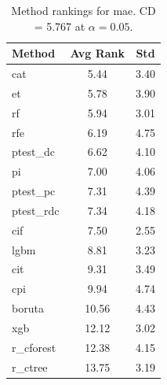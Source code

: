 \begin{table}[h]
\centering
\caption{Method rankings for mae. CD = 5.767 at $\alpha=0.05$.}
\label{tab:ranks_mae}
\begin{tabular}{lcc}
\toprule
Method & Avg Rank & Std \\
\midrule
cat & 5.44 & 3.40 \\
et & 5.78 & 3.90 \\
rf & 5.94 & 3.01 \\
rfe & 6.19 & 4.75 \\
ptest_dc & 6.62 & 4.10 \\
pi & 7.00 & 4.06 \\
ptest_pc & 7.31 & 4.39 \\
ptest_rdc & 7.34 & 4.18 \\
cif & 7.50 & 2.55 \\
lgbm & 8.81 & 3.23 \\
cit & 9.31 & 3.49 \\
cpi & 9.94 & 4.74 \\
boruta & 10.56 & 4.43 \\
xgb & 12.12 & 3.02 \\
r_cforest & 12.38 & 4.15 \\
r_ctree & 13.75 & 3.19 \\
\bottomrule
\end{tabular}
\end{table}